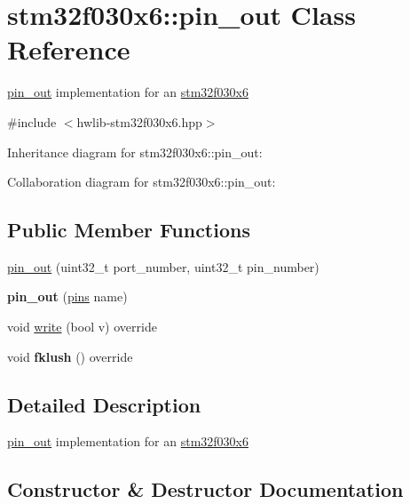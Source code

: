 \hypertarget{classstm32f030x6_1_1pin__out}{}\section{stm32f030x6\+:\+:pin\+\_\+out Class Reference}
\label{classstm32f030x6_1_1pin__out}


\hyperlink{classstm32f030x6_1_1pin__out}{pin\+\_\+out} implementation for an \hyperlink{namespacestm32f030x6}{stm32f030x6}  




{\ttfamily \#include $<$hwlib-\/stm32f030x6.\+hpp$>$}



Inheritance diagram for stm32f030x6\+:\+:pin\+\_\+out\+:


Collaboration diagram for stm32f030x6\+:\+:pin\+\_\+out\+:
\subsection*{Public Member Functions}
\begin{DoxyCompactItemize}
\item 
\hyperlink{classstm32f030x6_1_1pin__out_a330f2888ff00608e91f0f6cbd7dabc80}{pin\+\_\+out} (uint32\+\_\+t port\+\_\+number, uint32\+\_\+t pin\+\_\+number)
\item 
\mbox{\label{classstm32f030x6_1_1pin__out_aa39b841cedf29539fa5f65c6b5737f64}} 
{\bfseries pin\+\_\+out} (\hyperlink{namespacestm32f030x6_aec819db41bff19f45418c0d22e5ccecf}{pins} name)
\item 
void \hyperlink{classstm32f030x6_1_1pin__out_a6f859b59bf358e37fffe4d20fc5a718a}{write} (bool v) override
\item 
\mbox{\label{classstm32f030x6_1_1pin__out_a60a0a32244f92ea60ce0db0af50349ae}} 
void {\bfseries fklush} () override
\end{DoxyCompactItemize}


\subsection{Detailed Description}
\hyperlink{classstm32f030x6_1_1pin__out}{pin\+\_\+out} implementation for an \hyperlink{namespacestm32f030x6}{stm32f030x6} 

\subsection{Constructor \& Destructor Documentation}
\mbox{\label{classstm32f030x6_1_1pin__out_a330f2888ff00608e91f0f6cbd7dabc80}} 
